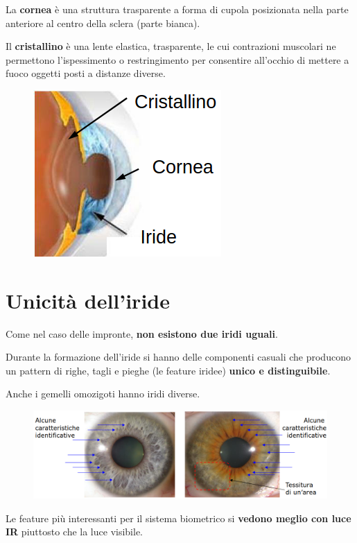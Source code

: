 La \textbf{cornea} è una struttura trasparente a forma di cupola 
posizionata nella parte anteriore al centro della sclera (parte bianca).

Il \textbf{cristallino} è una lente elastica, trasparente, le cui contrazioni muscolari ne 
permettono l'ispessimento o restringimento per consentire all'occhio di mettere a fuoco oggetti 
posti a distanze diverse.

\begin{figure}[ht]
    \centering
    \includegraphics[width=0.4\linewidth]{chapters/images-chap7/struttura-iride.png}
\end{figure}

\section{Unicità dell'iride}

Come nel caso delle impronte, \textbf{non esistono due iridi uguali}.

Durante la formazione dell'iride si hanno delle componenti casuali che 
producono un pattern di righe, tagli e pieghe (le feature iridee) \textbf{unico
e distinguibile}.

Anche i gemelli omozigoti hanno iridi diverse.

\begin{figure}[ht]
    \centering
    \includegraphics[width=1\linewidth]{chapters/images-chap7/unicita.png}
\end{figure}

Le feature più interessanti per il sistema biometrico si \textbf{vedono meglio con luce IR} 
piuttosto che la luce visibile.

